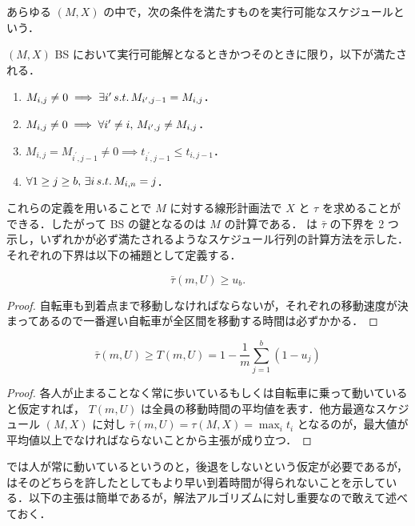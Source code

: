 あらゆる $(M, X)$ の中で，次の条件を満たすものを実行可能なスケジュールという．

\begin{definition}\label{definition:bs-feasible-schedule}
  $(M, X)$ BS において実行可能解となるときかつそのときに限り，以下が満たされる．
  \begin{enumerate}
  \item $M_{i, j} \neq 0 \implies \exists i^\prime \,s.t.\, M_{i^\prime, j - 1} = M_{i, j}$．
  \item $M_{i, j} \neq 0 \implies \forall i^\prime \neq i ,\, M_{i^\prime, j} \neq M_{i, j}$．
  \item $M_{i, j} = M_{i^\prime, j - 1} \neq 0 \implies t_{i^\prime,j-1} \leq t_{i,j-1}$．
  \item $\forall 1 \geq j \geq b,\, \exists i \,s.t.\, M_{i,n} = j$．
  \end{enumerate}
\end{definition}

これらの定義を用いることで $M$ に対する線形計画法で $X$ と $\tau$ を求めることができる．したがって BS の鍵となるのは $M$ の計算である． \textcite{czyzowicz} は $\bar\tau$ の下界を 2 つ示し，いずれかが必ず満たされるようなスケジュール行列の計算方法を示した．それぞれの下界は以下の補題として定義する．

\begin{lemma}
  \begin{equation}
    \bar\tau(m, U) \geq u_b.
  \end{equation}
\end{lemma}
\begin{proof}
  自転車も到着点まで移動しなければならないが，それぞれの移動速度が決まってあるので一番遅い自転車が全区間を移動する時間は必ずかかる．
\end{proof}

\begin{lemma}\label{lemma:lower-bound-bs}
  \begin{equation}
    \bar\tau(m, U) \geq T(m, U) = 1 - \frac{1}{m}\sum_{j = 1}^b(1 - u_j)
  \end{equation}
\end{lemma}
\begin{proof}
  各人が止まることなく常に歩いているもしくは自転車に乗って動いていると仮定すれば， $T(m, U)$ は全員の移動時間の平均値を表す．他方最適なスケジュール $(M, X)$ に対し $\bar\tau(m, U) = \tau(M, X) = \max_i t_i$ となるのが，最大値が平均値以上でなければならないことから主張が成り立つ．
\end{proof}
 では人が常に動いているというのと，後退をしないという仮定が必要であるが，\textcite{czyzowicz} はそのどちらを許したとしてもより早い到着時間が得られないことを示している．以下の主張は簡単であるが，解法アルゴリズムに対し重要なので敢えて述べておく．

